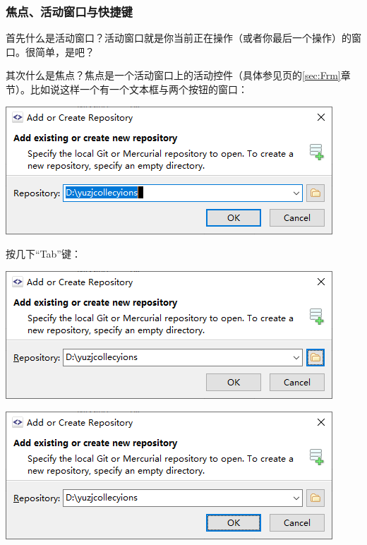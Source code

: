 \subsubsection{焦点、活动窗口与快捷键}
首先什么是活动窗口？活动窗口就是你当前正在操作（或者你最后一个操作）的窗口。很简单，是吧？\par
其次什么是焦点？焦点是一个活动窗口上的活动控件（具体参见\pageref{sec:Frm}页的\ref{sec:Frm}章节）。比如说这样一个有一个文本框与两个按钮的窗口：\par
\begin{center}
	\includegraphics{pic/forcus1}
\end{center} \par
按几下“Tab”键：\par
\begin{center}
	\includegraphics{pic/forcus2}
\end{center} \par
\begin{center}
	\includegraphics{pic/forcus3}
\end{center} \par
